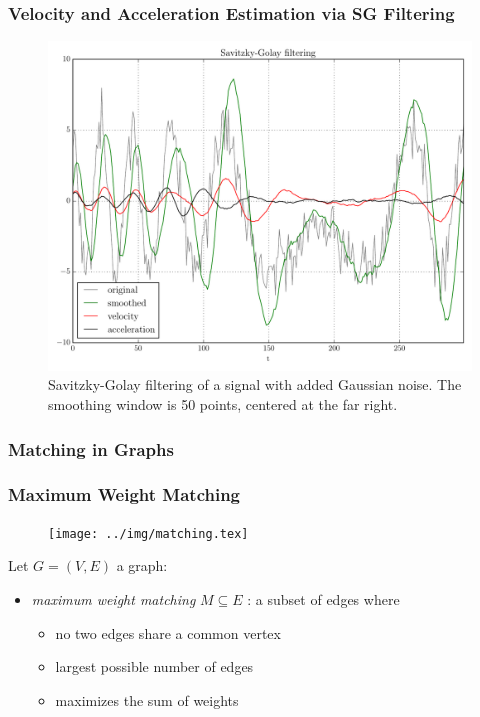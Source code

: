 \documentclass[hyperref={pdfpagelabels=false}]{beamer}
\begin{document}
\begin{frame} \frametitle{Velocity and Acceleration Estimation via SG Filtering}
\begin{figure}
\centering\includegraphics[scale=0.30]{../img/savgol.pdf}
\caption{Savitzky-Golay filtering of a signal with added Gaussian noise. The smoothing window is 50 points, centered at the far right.} 
\label{fig:savgol}
\end{figure}
\end{frame}

\subsubsection*{Matching in Graphs}
\begin{frame} \frametitle{Maximum Weight Matching}
\begin{figure}
\centering
\texttt{[image: ../img/matching.tex]}
\end{figure}
Let $G=(V,E)$ a graph:
\begin{itemize}
\item \emph{maximum weight matching} $M\subseteq E$ : a subset of edges where 
\begin{itemize}
\item no two edges share a common vertex
\item largest possible number of edges
\item maximizes the sum of weights
\end{itemize}
\end{itemize}
\end{frame}
\end{document}
